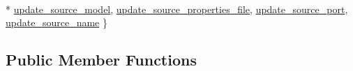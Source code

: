 \begin{DoxyCompactItemize}
\\*
\hyperlink{classSsrSceneAutomationAudioProcessor_ac035d17c84c4f0155bf36023b3f6cb66a082181b4b71a0723500fec23f03fef22}{update\-\_\-source\-\_\-model}, 
\hyperlink{classSsrSceneAutomationAudioProcessor_ac035d17c84c4f0155bf36023b3f6cb66a0f444263ba395044235167310a3b1a6d}{update\-\_\-source\-\_\-properties\-\_\-file}, 
\hyperlink{classSsrSceneAutomationAudioProcessor_ac035d17c84c4f0155bf36023b3f6cb66acc70935b8db10b939d19757af8b7198f}{update\-\_\-source\-\_\-port}, 
\hyperlink{classSsrSceneAutomationAudioProcessor_ac035d17c84c4f0155bf36023b3f6cb66a1a23cacc25a77c408b2267f0c69c24dc}{update\-\_\-source\-\_\-name}
 \}
\end{DoxyCompactItemize}
\subsection*{Public Member Functions}

